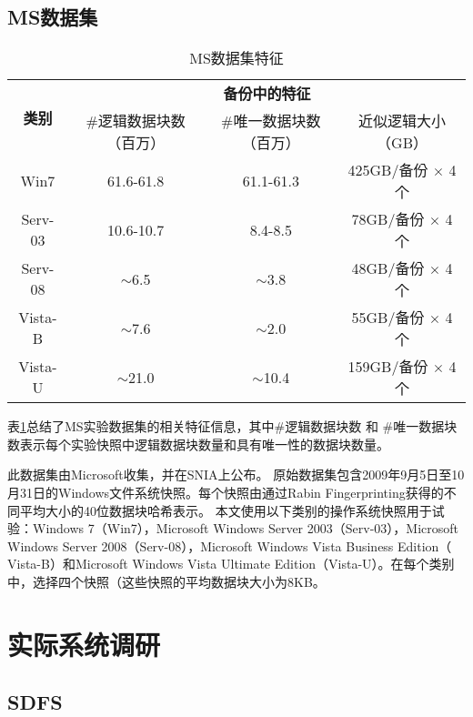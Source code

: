 \subsection{MS数据集}
\label{sec:ubc-ms}
\begin{table}[!hbt]
    \caption{MS数据集特征}
\small
\label{tab:MS-dataset}
\renewcommand{\arraystretch}{1.2}
\vspace{-3pt}
\centering
\begin{tabular}{|c|c|c|c|}
\hline
\multirow{2}{*}{\bf 类别} & \multicolumn{3}{c|}{\bf 备份中的特征} \\
\cline{2-4}
    & \#逻辑数据块数（百万） & \#唯一数据块数（百万） & 近似逻辑大小（GB）\\

\hline
Win7  & 61.6-61.8 & 61.1-61.3 & 425GB/备份 $\times$ 4 个\\
\cline{1-4}
Serv-03 & 10.6-10.7 & 8.4-8.5 & 78GB/备份 $\times$ 4 个\\
\cline{1-4}
Serv-08 & $\sim$6.5 & $\sim$3.8 & 48GB/备份 $\times$ 4 个\\
\cline{1-4}
Vista-B &  $\sim$7.6 & $\sim$2.0 & 55GB/备份 $\times$ 4 个\\
\cline{1-4}
Vista-U &  $\sim$21.0 & $\sim$10.4 & 159GB/备份 $\times$ 4 个\\
\hline
\end{tabular}
\end{table}

表\ref{tab:MS-dataset}总结了MS实验数据集的相关特征信息，其中\#逻辑数据块数 和 \#唯一数据块数表示每个实验快照中逻辑数据块数量和具有唯一性的数据块数量。

此数据集由Microsoft收集，并在SNIA上公布。 原始数据集包含2009年9月5日至10月31日的Windows文件系统快照。每个快照由通过Rabin Fingerprinting获得的不同平均大小的40位数据块哈希表示。 本文使用以下类别的操作系统快照用于试验：Windows 7（Win7），Microsoft Windows Server 2003（Serv-03），Microsoft Windows Server 2008（Serv-08），Microsoft Windows Vista Business Edition（ Vista-B）和Microsoft Windows Vista Ultimate Edition（Vista-U）。在每个类别中，选择四个快照（这些快照的平均数据块大小为8KB。 


\section{实际系统调研}
\subsection{SDFS}

